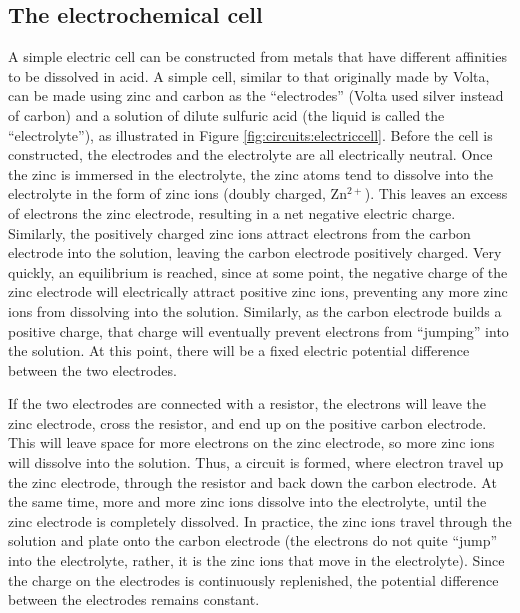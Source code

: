 \subsection{The electrochemical cell}
A simple electric cell can be constructed from metals that have different affinities to be dissolved in acid. A simple cell, similar to that originally made by Volta, can be made using zinc and carbon as the ``electrodes'' (Volta used silver instead of carbon) and a solution of dilute sulfuric acid (the liquid is called the ``electrolyte''), as illustrated in Figure \ref{fig:circuits:electriccell}. Before the cell is constructed, the electrodes and the electrolyte are all electrically neutral.
Once the zinc is immersed in the electrolyte, the zinc atoms tend to dissolve into the electrolyte in the form of zinc ions (doubly charged, Zn$^{2+}$). This leaves an excess of electrons the zinc electrode, resulting in a net negative electric charge. Similarly, the positively charged zinc ions attract electrons from the carbon electrode into the solution, leaving the carbon electrode positively charged. Very quickly, an equilibrium is reached, since at some point, the negative charge of the zinc electrode will electrically attract positive zinc ions, preventing any more zinc ions from dissolving into the solution. Similarly, as the carbon electrode builds a positive charge, that charge will eventually prevent electrons from ``jumping'' into the solution. At this point, there will be a fixed electric potential difference between the two electrodes. 

If the two electrodes are connected with a resistor, the electrons will leave the zinc electrode, cross the resistor, and end up on the positive carbon electrode. This will leave space for more electrons on the zinc electrode, so more zinc ions will dissolve into the solution. Thus, a circuit is formed, where electron travel up the zinc electrode, through the resistor and back down the carbon electrode. At the same time, more and more zinc ions dissolve into the electrolyte, until the zinc electrode is completely dissolved. In practice, the zinc ions travel through the solution and plate onto the carbon electrode (the electrons do not quite ``jump'' into the electrolyte, rather, it is the zinc ions that move in the electrolyte). Since the charge on the electrodes is continuously replenished, the potential difference between the electrodes remains constant.

